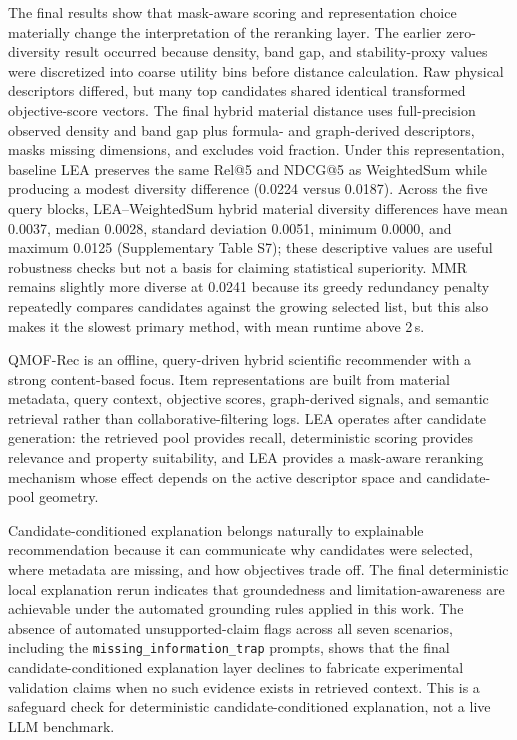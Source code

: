 \documentclass[12pt,a4paper]{article}
\begin{document}
The final results show that mask-aware scoring and representation choice materially change the interpretation of the reranking layer. The earlier zero-diversity result occurred because density, band gap, and stability-proxy values were discretized into coarse utility bins before distance calculation. Raw physical descriptors differed, but many top candidates shared identical transformed objective-score vectors. The final hybrid material distance uses full-precision observed density and band gap plus formula- and graph-derived descriptors, masks missing dimensions, and excludes void fraction. Under this representation, baseline LEA preserves the same Rel@5 and NDCG@5 as WeightedSum while producing a modest diversity difference (0.0224 versus 0.0187). Across the five query blocks, LEA--WeightedSum hybrid material diversity differences have mean 0.0037, median 0.0028, standard deviation 0.0051, minimum 0.0000, and maximum 0.0125 (Supplementary Table S7); these descriptive values are useful robustness checks but not a basis for claiming statistical superiority. MMR remains slightly more diverse at 0.0241 because its greedy redundancy penalty repeatedly compares candidates against the growing selected list, but this also makes it the slowest primary method, with mean runtime above 2\,s.

QMOF-Rec is an offline, query-driven hybrid scientific recommender with a strong content-based focus. Item representations are built from material metadata, query context, objective scores, graph-derived signals, and semantic retrieval rather than collaborative-filtering logs. LEA operates after candidate generation: the retrieved pool provides recall, deterministic scoring provides relevance and property suitability, and LEA provides a mask-aware reranking mechanism whose effect depends on the active descriptor space and candidate-pool geometry.

Candidate-conditioned explanation belongs naturally to explainable recommendation because it can communicate why candidates were selected, where metadata are missing, and how objectives trade off. The final deterministic local explanation rerun indicates that groundedness and limitation-awareness are achievable under the automated grounding rules applied in this work. The absence of automated unsupported-claim flags across all seven scenarios, including the \texttt{missing\_information\_trap} prompts, shows that the final candidate-conditioned explanation layer declines to fabricate experimental validation claims when no such evidence exists in retrieved context. This is a safeguard check for deterministic candidate-conditioned explanation, not a live LLM benchmark.
\end{document}
